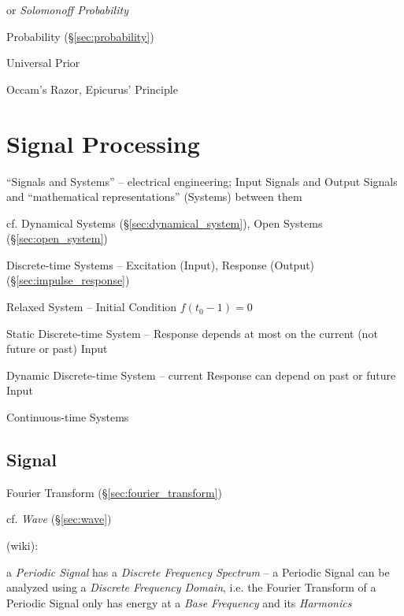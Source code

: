 or \emph{Solomonoff Probability}

\fist Probability (\S\ref{sec:probability})

Universal Prior

Occam's Razor, Epicurus' Principle



\section{Signal Processing}\label{sec:signal_processing}

``Signals and Systems'' -- electrical engineering; Input Signals and Output
Signals and ``mathematical representations'' (Systems) between them

\fist cf. Dynamical Systems (\S\ref{sec:dynamical_system}), Open Systems
(\S\ref{sec:open_system})


Discrete-time Systems -- Excitation (Input), Response (Output)
(\S\ref{sec:impulse_response})

Relaxed System -- Initial Condition $f(t_0-1) = 0$

Static Discrete-time System -- Response depends at most on the current (not
future or past) Input

Dynamic Discrete-time System -- current Response can depend on past or future
Input

Continuous-time Systems



\subsection{Signal}\label{sec:signal}

\fist Fourier Transform (\S\ref{sec:fourier_transform})

cf. \emph{Wave} (\S\ref{sec:wave})

(wiki):

a \emph{Periodic Signal} has a \emph{Discrete Frequency Spectrum} -- a Periodic
Signal can be analyzed using a \emph{Discrete Frequency Domain}, i.e. the
Fourier Transform of a Periodic Signal only has energy at a \emph{Base
  Frequency} and its \emph{Harmonics}

